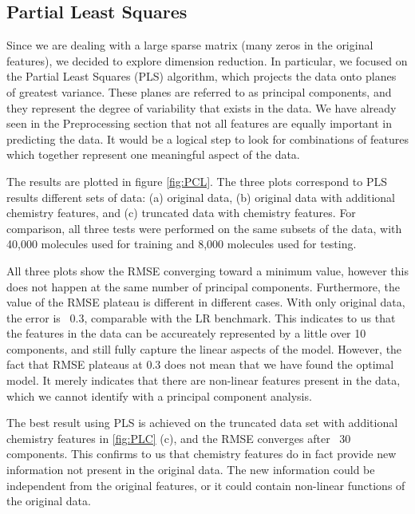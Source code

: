 \documentclass[11pt]{article}
\begin{document}
    \subsection{Partial Least Squares}
Since we are dealing with a large sparse matrix (many zeros in the original features), we decided to explore dimension reduction. In particular, we focused on the Partial Least Squares (PLS) algorithm, which projects the data onto planes of greatest variance. These planes are referred to as principal components, and they represent the degree of variability that exists in the data. We have already seen in the Preprocessing section that not all features are equally important in predicting the data. It would be a logical step to look for combinations of features which together represent one meaningful aspect of the data. 

The results are plotted in figure \ref{fig:PCL}.  The three plots correspond to PLS results different sets of data: (a) original data, (b) original data with additional chemistry features, and (c) truncated data with chemistry features. For comparison, all three tests were performed on the same subsets of the data, with 40,000 molecules used for training and 8,000 molecules used for testing. 

All three plots show the RMSE converging toward a minimum value, however this does not happen at the same number of principal components. Furthermore, the value of the RMSE plateau is different in different cases. With only original data, the error is ~0.3, comparable with the LR benchmark. This indicates to us that the features in the data can be accureately represented by a little over 10 components, and still fully capture the linear aspects of the model. However, the fact that RMSE plateaus at 0.3 does not mean that we have found the optimal model. It merely indicates that there are non-linear features present in the data, which we cannot identify with a principal component analysis. 

The best result using PLS is achieved on the truncated data set with additional chemistry features in \ref{fig:PLC} (c), and the RMSE converges after ~30 components. This confirms to us that chemistry features do in fact provide new information not present in the original data. The new information could be independent from the original features, or it could contain non-linear functions of the original data. 
\end{document}
